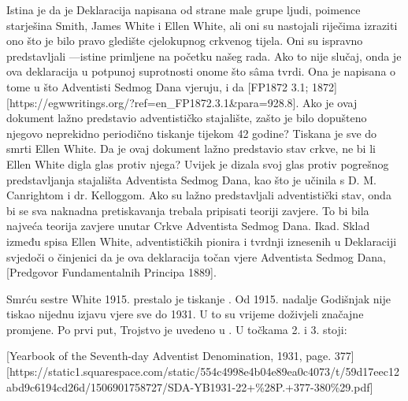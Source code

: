 Istina je da je Deklaracija  napisana od strane male grupe ljudi, poimence starješina Smith, James White i Ellen White, ali oni su nastojali riječima izraziti ono što je bilo pravo gledište cjelokupnog crkvenog tijela. Oni su ispravno predstavljali —istine primljene na početku našeg rada. Ako to nije slučaj, onda je ova deklaracija u potpunoj suprotnosti onome što sâma tvrdi. Ona je napisana  o tome u što Adventisti Sedmog Dana vjeruju,  i da [FP1872 3.1; 1872][https://egwwritings.org/?ref=en\_FP1872.3.1&para=928.8]. Ako je ovaj dokument lažno predstavio adventističko stajalište, zašto je bilo dopušteno njegovo neprekidno periodično tiskanje tijekom 42 godine? Tiskana je sve do smrti Ellen White. Da je ovaj dokument lažno predstavio stav crkve, ne bi li Ellen White digla glas protiv njega? Uvijek je dizala svoj glas protiv pogrešnog predstavljanja stajališta Adventista Sedmog Dana, kao što je učinila s D. M. Canrightom i dr. Kelloggom. Ako su  lažno predstavljali adventistički stav, onda bi se sva naknadna pretiskavanja trebala pripisati teoriji zavjere. To bi bila najveća teorija zavjere unutar Crkve Adventista Sedmog Dana. Ikad. Sklad između spisa Ellen White, adventističkih pionira i tvrdnji iznesenih u Deklaraciji  svjedoči o činjenici da je ova deklaracija točan  vjere Adventista Sedmog Dana, [Predgovor Fundamentalnih Principa 1889].

Smrću sestre White 1915. prestalo je tiskanje . Od 1915. nadalje Godišnjak nije tiskao nijednu izjavu vjere sve do 1931. U to su vrijeme  doživjeli značajne promjene. Po prvi put, Trojstvo je uvedeno u . U točkama 2. i 3. stoji:


[Yearbook of the Seventh-day Adventist Denomination, 1931, page. 377][https://static1.squarespace.com/static/554c4998e4b04e89ea0c4073/t/59d17eec12abd9c6194cd26d/1506901758727/SDA-YB1931-22+\%28P.+377-380\%29.pdf]

